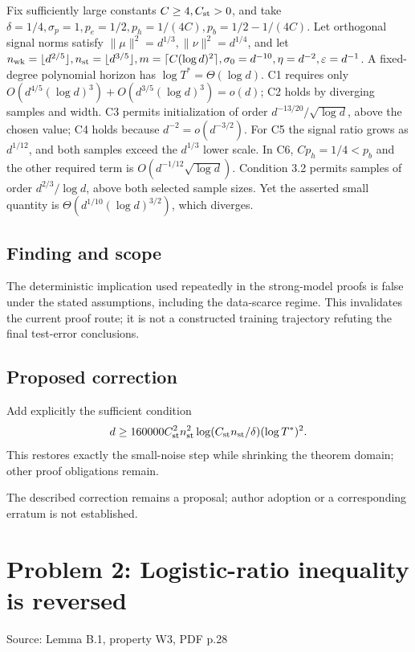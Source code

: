 \documentclass[11pt]{article}
\begin{document}
Fix sufficiently large constants \(C\geq4,C_{\rm st}>0\), and take \(\delta=1/4,\sigma_p=1,p_e=1/2,p_h=1/(4C),p_b=1/2-1/(4C)\). Let orthogonal signal norms satisfy \(\|\mu\|^2=d^{1/3},\|\nu\|^2=d^{1/4}\), and let \(n_{\rm wk}=\lfloor d^{2/5}\rfloor,n_{\rm st}=\lfloor d^{3/5}\rfloor,m=\lceil C(\log d)^2\rceil,\sigma_0=d^{-10},\eta=d^{-2},\varepsilon=d^{-1}\). A fixed-degree polynomial horizon has \(\log T^*=\Theta(\log d)\). C1 requires only \(O(d^{4/5}(\log d)^3)+O(d^{3/5}(\log d)^3)=o(d)\); C2 holds by diverging samples and width. C3 permits initialization of order \(d^{-13/20}/\sqrt{\log d}\), above the chosen value; C4 holds because \(d^{-2}=o(d^{-3/2})\). For C5 the signal ratio grows as \(d^{1/12}\), and both samples exceed the \(d^{1/3}\) lower scale. In C6, \(Cp_h=1/4<p_b\) and the other required term is \(O(d^{-1/12}\sqrt{\log d})\). Condition 3.2 permits samples of order \(d^{2/3}/\log d\), above both selected sample sizes. Yet the asserted small quantity is \(\Theta(d^{1/10}(\log d)^{3/2})\), which diverges.

\subsection*{Finding and scope}

The deterministic implication used repeatedly in the strong-model proofs is false under the stated assumptions, including the data-scarce regime. This invalidates the current proof route; it is not a constructed training trajectory refuting the final test-error conclusions.

\subsection*{Proposed correction}

Add explicitly the sufficient condition \[d\geq160000C_{\rm st}^2n_{\rm st}^2\log(C_{\rm st}n_{\rm st}/\delta)(\log T^*)^2.\] This restores exactly the small-noise step while shrinking the theorem domain; other proof obligations remain.

The described correction remains a proposal; author adoption or a corresponding erratum is not established.

\section*{Problem 2: Logistic-ratio inequality is reversed}

Source: Lemma B.1, property W3, PDF p.28
\end{document}
